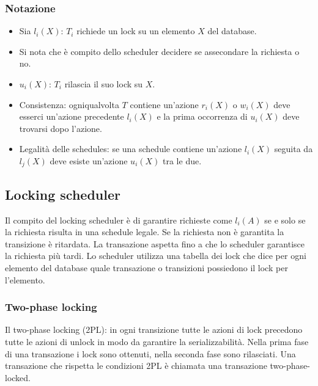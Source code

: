 \subsubsection{Notazione}
\begin{itemize}
\item Sia $l_i(X)$: $T_i$ richiede un lock su un elemento $X$ del database. 
\item Si nota che \`e compito dello scheduler decidere se assecondare la richiesta o no.
\item $u_i(X)$: $T_i$ rilascia il suo lock su $X$. 
\item Consistenza: ogniqualvolta $T$ contiene un'azione $r_i(X)$ o $w_i(X)$ deve esserci un'azione precedente $l_i(X)$ e la prima occorrenza di  $u_i(X)$ deve trovarsi dopo l'azione.
\item Legalit\`a delle schedules: se una schedule contiene un'azione $l_i(X)$ seguita da $l_j(X)$ deve esiste un'azione $u_i(X)$ tra le due.   
\end{itemize}
\subsection{Locking scheduler}
Il compito del locking scheduler \`e di garantire richieste come $l_i(A)$ se e solo se la richiesta risulta in una schedule legale. Se la richiesta non \`e garantita la transizione \`e ritardata. La transazione aspetta 
fino a che lo scheduler garantisce la richiesta pi\`u tardi. Lo scheduler utilizza una tabella dei lock che dice per ogni elemento del database quale transazione o transizioni possiedono il lock per l'elemento.
\subsubsection{Two-phase locking}
Il two-phase locking (2PL): in ogni transizione tutte le azioni di lock precedono tutte le azioni di unlock in modo da garantire la serializzabilit\`a. Nella prima fase di una transazione i lock sono ottenuti, nella 
seconda fase sono rilasciati. Una transazione che rispetta le condizioni 2PL \`e chiamata una transazione two-phase-locked. 
